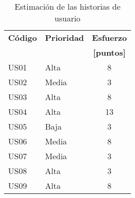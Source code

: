 \begin{table}[H]

  \begin{center}
    \begin{tabularx}{0.5\textwidth}{ XXc }
      \toprule
        \textbf{C\'odigo} &
        \textbf{Prioridad} &
        \textbf{Esfuerzo} \\
        &&\textbf{[puntos]} \\

      \midrule
      US01 & Alta & 8 \\
      US02 & Media & 3 \\
      US03 & Alta & 8 \\
      US04 & Alta & 13 \\
      US05 & Baja & 3 \\
      US06 & Media & 8 \\
      US07 & Media & 3 \\
      US08 & Alta & 3 \\
      US09 & Alta & 8 \\


      \bottomrule
    \end{tabularx}
    \caption{Estimación de las historias de usuario}
    \label{tab:estimation_user_stories}
  \end{center}
\end{table}
